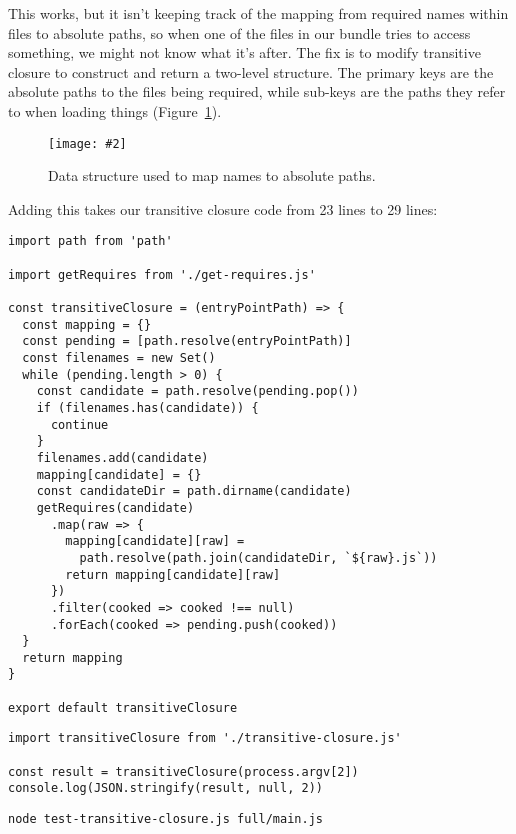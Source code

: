 \documentclass[krantzl]{krantz}
\newcommand{\figpdf}[4]{\begin{figure}%
\centering%
\texttt{[image: \#2]}%
\caption{#3}%
\label{#1}%
\end{figure}}
\newcommand{\figref}[1]{Figure~\ref{#1}}
\begin{document}
This works,
but it isn't keeping track of the mapping from required names within files to absolute paths,
so when one of the files in our bundle tries to access something,
we might not know what it's after.
The fix is to modify transitive closure to construct and return a two-level structure.
The primary keys are the absolute paths to the files being required,
while sub-keys are the paths they refer to when loading things
(\figref{module-bundler-structure}).

\figpdf{module-bundler-structure}{./module-bundler/structure.pdf}{Data structure used to map names to absolute paths.}{0.6}


Adding this takes our transitive closure code from
23 lines
to 29 lines:


\begin{lstlisting}[frame=single,frameround=tttt]
import path from 'path'

import getRequires from './get-requires.js'

const transitiveClosure = (entryPointPath) => {
  const mapping = {}
  const pending = [path.resolve(entryPointPath)]
  const filenames = new Set()
  while (pending.length > 0) {
    const candidate = path.resolve(pending.pop())
    if (filenames.has(candidate)) {
      continue
    }
    filenames.add(candidate)
    mapping[candidate] = {}
    const candidateDir = path.dirname(candidate)
    getRequires(candidate)
      .map(raw => {
        mapping[candidate][raw] =
          path.resolve(path.join(candidateDir, `${raw}.js`))
        return mapping[candidate][raw]
      })
      .filter(cooked => cooked !== null)
      .forEach(cooked => pending.push(cooked))
  }
  return mapping
}

export default transitiveClosure
\end{lstlisting}



\begin{lstlisting}[frame=single,frameround=tttt]
import transitiveClosure from './transitive-closure.js'

const result = transitiveClosure(process.argv[2])
console.log(JSON.stringify(result, null, 2))
\end{lstlisting}



\begin{lstlisting}[frame=single,frameround=tttt]
node test-transitive-closure.js full/main.js
\end{lstlisting}
\end{document}
